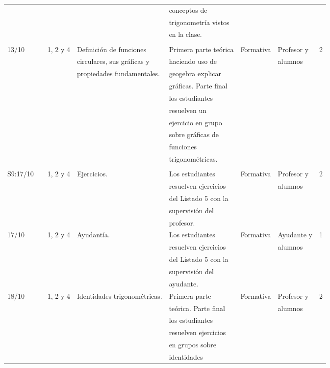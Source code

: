 \documentclass[11pt]{article}
\begin{document}
{\begin{center}
\begin{longtable}{|l|l|l|l|l|l|l|l|}
 & & & & conceptos de & & & \\
 & & & & trigonometría vistos & & & \\
 & & & & en la clase. & & & \\
 & & & & & & & \\
\hline
13/10 & & 1, 2 y 4 & Definición de funciones & Primera parte teórica & Formativa & Profesor y & 2 \\
 & & & circulares, sus gráficas y & haciendo uso de & & alumnos & \\
 & & & propiedades fundamentales. & geogebra explicar & & & \\
 & & & & gráficas. Parte final & & & \\
 & & & & los estudiantes & & & \\
 & & & & resuelven un & & & \\
 & & & & ejercicio en grupo & & & \\
 & & & & sobre gráficas de & & & \\
 & & & & funciones & & & \\
 & & & & trigonométricas. & & & \\
 & & & & & & & \\
\hline
S9:17/10 & & 1, 2 y 4 & Ejercicios. & Los estudiantes & Formativa & Profesor y & 2 \\
 & & & & resuelven ejercicios & & alumnos & \\
 & & & & del Listado 5 con la & & & \\
 & & & & supervisión del & & & \\
 & & & & profesor. & & & \\
\hline
17/10 & & 1, 2 y 4 & Ayudantía. & Los estudiantes & Formativa & Ayudante y & 1 \\
 & & & & resuelven ejercicios & & alumnos & \\
 & & & & del Listado 5 con la & & & \\
 & & & & supervisión del & & & \\
 & & & & ayudante. & & & \\
\hline
18/10 & & 1, 2 y 4 & Identidades trigonométricas. & Primera parte & Formativa & Profesor y & 2 \\
 & & & & teórica. Parte final & & alumnos & \\
 & & & & los estudiantes & & & \\
 & & & & resuelven ejercicios & & & \\
 & & & & en grupos sobre & & & \\
 & & & & identidades & & & \\

\end{longtable}
\end{center}}
\end{document}

